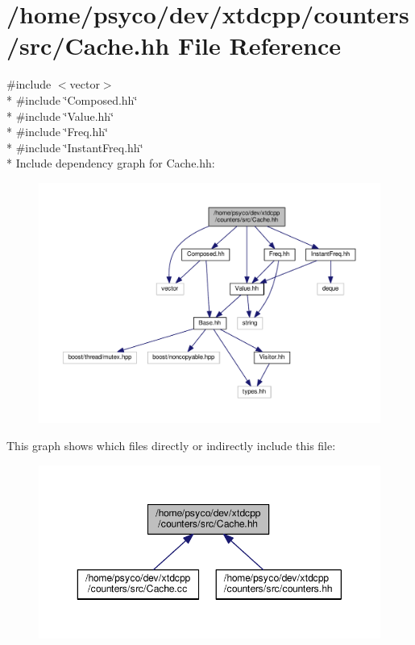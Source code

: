 \hypertarget{Cache_8hh}{}\section{/home/psyco/dev/xtdcpp/counters/src/\+Cache.hh File Reference}
\label{Cache_8hh}
{\ttfamily \#include $<$vector$>$}\\*
{\ttfamily \#include \char`\"{}Composed.\+hh\char`\"{}}\\*
{\ttfamily \#include \char`\"{}Value.\+hh\char`\"{}}\\*
{\ttfamily \#include \char`\"{}Freq.\+hh\char`\"{}}\\*
{\ttfamily \#include \char`\"{}Instant\+Freq.\+hh\char`\"{}}\\*
Include dependency graph for Cache.\+hh\+:
\nopagebreak
\begin{figure}[H]
\begin{center}
\leavevmode
\includegraphics[width=350pt]{Cache_8hh__incl}
\end{center}
\end{figure}
This graph shows which files directly or indirectly include this file\+:
\nopagebreak
\begin{figure}[H]
\begin{center}
\leavevmode
\includegraphics[width=350pt]{Cache_8hh__dep__incl}
\end{center}
\end{figure}
